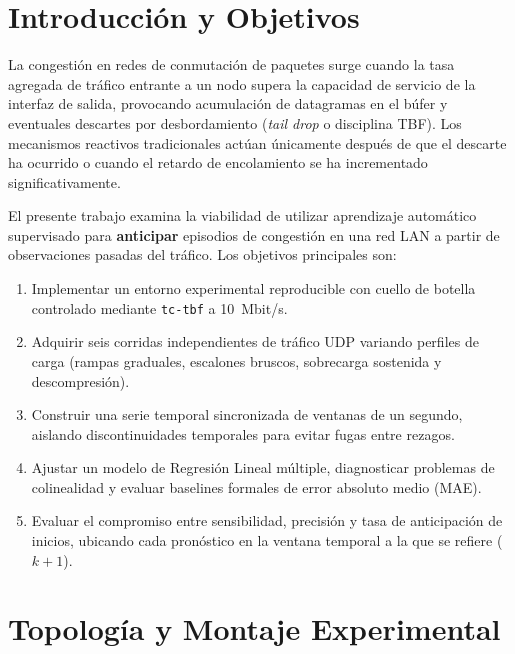\documentclass[11pt,a4paper]{article}
\begin{document}
\vspace{0.2cm}
\tableofcontents
\vspace{0.3cm}

\section{Introducción y Objetivos}

La congestión en redes de conmutación de paquetes surge cuando la tasa agregada de tráfico entrante a un nodo supera la capacidad de servicio de la interfaz de salida, provocando acumulación de datagramas en el búfer y eventuales descartes por desbordamiento (\textit{tail drop} o disciplina TBF). Los mecanismos reactivos tradicionales actúan únicamente después de que el descarte ha ocurrido o cuando el retardo de encolamiento se ha incrementado significativamente.

El presente trabajo examina la viabilidad de utilizar aprendizaje automático supervisado para \textbf{anticipar} episodios de congestión en una red LAN a partir de observaciones pasadas del tráfico. Los objetivos principales son:
\begin{enumerate}
    \item Implementar un entorno experimental reproducible con cuello de botella controlado mediante \texttt{tc-tbf} a 10~Mbit/s.
    \item Adquirir seis corridas independientes de tráfico UDP variando perfiles de carga (rampas graduales, escalones bruscos, sobrecarga sostenida y descompresión).
    \item Construir una serie temporal sincronizada de ventanas de un segundo, aislando discontinuidades temporales para evitar fugas entre rezagos.
    \item Ajustar un modelo de Regresión Lineal múltiple, diagnosticar problemas de colinealidad y evaluar baselines formales de error absoluto medio (MAE).
    \item Evaluar el compromiso entre sensibilidad, precisión y tasa de anticipación de inicios, ubicando cada pronóstico en la ventana temporal a la que se refiere ($k+1$).
\end{enumerate}

\section{Topología y Montaje Experimental}
\end{document}
